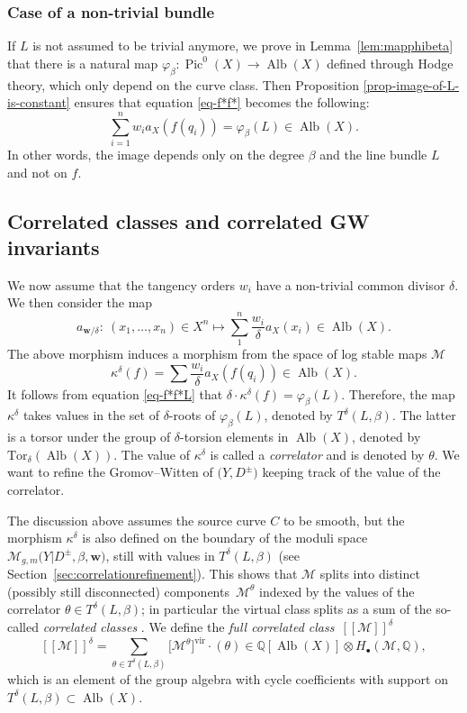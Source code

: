 \documentclass[11pt]{article}
\numberwithin{equation}{section}
\newcommand{\Tor}{\mathrm{Tor}}
\newcommand{\vir}[1]{\big[#1\big]^\mathrm{vir}}
\newcommand{\fvir}[2]{[\![ #1 ]\!]^{#2}}
\newcommand{\Pic}{\operatorname{Pic}}
\newcommand{\Alb}{\operatorname{Alb}}
\newcommand{\QQ}{\mathbb{Q}}
\newcommand{\bfw}{ {\boldsymbol w} }
\newcommand{\M}{\mathcal{M}}
\numberwithin{equation}{section}
\theoremstyle{definition}
\begin{document}
\subsubsection{Case of a non-trivial bundle} If $L$ is not assumed to be trivial anymore, we prove in Lemma~\ref{lem:mapphibeta} that there is a natural map $\varphi_\beta\colon \Pic^0(X)\to\Alb(X)$ defined through Hodge theory, which only depend on the curve class. Then
Proposition \ref{prop-image-of-L-is-constant} ensures that equation \eqref{eq-f*f*} becomes the following:
\begin{equation}\label{eq-f*f*L}
\sum_{i=1}^n w_ia_X(f(q_i)) = \varphi_\beta(L)\in\Alb(X).
\end{equation}
In other words, the image depends only on the degree $\beta$ and the line bundle $L$ and not on $f$.

\subsection{Correlated classes and correlated GW invariants} We now assume that the tangency orders $w_i$ have a non-trivial common divisor $\delta$. We then consider the map
\[
a_{\bfw/\delta}\colon\ (x_1,\dots,x_n)\in X^n\longmapsto\sum_1^n\frac{w_i}{\delta}a_X(x_i)\in \Alb(X).
 \]
The above morphism induces a morphism from the space of log stable maps $\M$
\[\kappa^\delta(f)=\sum \frac{w_i}{\delta}a_X(f(q_i))\in\Alb(X).\]
It follows from equation \eqref{eq-f*f*L} that
$\delta\cdot\kappa^\delta(f)=\varphi_\beta(L)$.
Therefore, the map $\kappa^\delta$ takes values in the set of $\delta$-roots of $\varphi_\beta(L)$, denoted by $T^\delta(L,\beta)$. The latter is a torsor under the group of $\delta$-torsion elements in $\Alb(X)$, denoted by $\Tor_\delta(\Alb(X))$.
The value of $\kappa^\delta$ is called a \textit{correlator} and is denoted by $\theta$.
We want to refine the Gromov--Witten of $\bigl(Y,D^{\pm}\bigr)$ keeping track of the value of the correlator.

The discussion above assumes the source curve $C$ to be smooth, but the morphism $\kappa^\delta$
is also defined on the boundary of the moduli space $\M_{g,m}\bigl(Y|D^{\pm},\beta,\bfw\bigr)$, still with values in $T^\delta(L,\beta)$ (see Section~\ref{sec:correlationrefinement}).
This shows that
 $\M$ splits into distinct (possibly still disconnected) components~$\M^\theta$ indexed by the values of the correlator $\theta\in T^\delta(L,\beta)$; in particular the virtual class splits as a sum of the so-called \textit{correlated classes} \smash{$\vir{\M^\theta}$}. We define the \textit{full correlated class}~$\fvir{\M}{\delta}$
\[ \fvir{\M}{\delta}=\sum_{\theta\in T^\delta(L,\beta)} \vir{\M^\theta}\cdot(\theta)\in \QQ[\Alb(X)]\otimes H_\bullet(\M,\QQ), \]
which is an element of the group algebra with cycle coefficients with support on $T^\delta(L,\beta)\subset\Alb(X)$.
\end{document}
